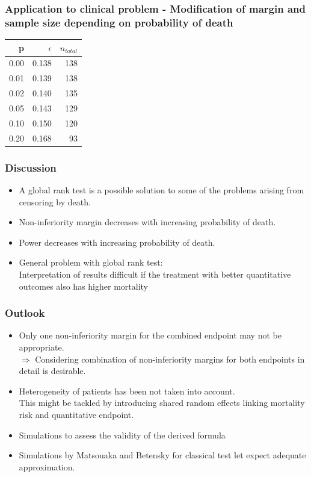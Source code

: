 \documentclass[xcolor=pdftex,dvipsnames,table]{beamer}\usepackage[]{graphicx}\usepackage[]{color}
\begin{document}
\begin{frame}[label = slide13,fragile] %
\frametitle{Application to clinical problem - Modification of margin and sample size depending on probability of death}

\begin{table}[ht]
\centering
\begin{tabular}{rrr}
  \hline
p & $\epsilon$ & $n_{total}$ \\ 
  \hline
0.00 & 0.138 & 138 \\ 
  0.01 & 0.139 & 138 \\ 
  0.02 & 0.140 & 135 \\ 
  0.05 & 0.143 & 129 \\ 
  0.10 & 0.150 & 120 \\ 
  0.20 & 0.168 & 93 \\ 
   \hline
\end{tabular}
\end{table}

\end{frame}

\begin{frame}[label = slide14] %
\frametitle{Discussion}
\begin{itemize}
\item A global rank test is a possible solution to some of the problems arising from censoring by death.
\item Non-inferiority margin decreases with increasing probability of death.
\item Power decreases with increasing probability of death.
\item General problem with global rank test: \\
      Interpretation of results difficult if the treatment with better quantitative outcomes also has higher mortality \\
\end{itemize}
\end{frame}

\begin{frame}[label = slide15] %
\frametitle{Outlook}
\begin{itemize}
\item Only one non-inferiority margin for the combined endpoint may not be appropriate. \\
$\Rightarrow$  Considering combination of non-inferiority margins for both endpoints in detail is desirable.
\item Heterogeneity of patients has been not taken into account. \\
      This might be tackled by introducing shared random effects linking mortality risk and quantitative endpoint.
\item Simulations to assess the validity of the derived formula
\item Simulations by Matsouaka and Betensky for classical test let expect adequate approximation.
\end{itemize}
\end{frame}
\end{document}
